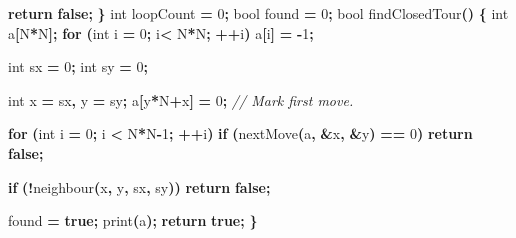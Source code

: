 \documentclass[
]{article}
\newenvironment{Shaded}{\begin{snugshade}}{\end{snugshade}}
\newcommand{\CommentTok}[1]{\textcolor[rgb]{0.56,0.35,0.01}{\textit{#1}}}
\newcommand{\ControlFlowTok}[1]{\textcolor[rgb]{0.13,0.29,0.53}{\textbf{#1}}}
\newcommand{\DataTypeTok}[1]{\textcolor[rgb]{0.13,0.29,0.53}{#1}}
\newcommand{\DecValTok}[1]{\textcolor[rgb]{0.00,0.00,0.81}{#1}}
\newcommand{\KeywordTok}[1]{\textcolor[rgb]{0.13,0.29,0.53}{\textbf{#1}}}
\newcommand{\NormalTok}[1]{#1}
\newcommand{\OperatorTok}[1]{\textcolor[rgb]{0.81,0.36,0.00}{\textbf{#1}}}
\begin{document}
\begin{Shaded}
\begin{Highlighting}[]
    \ControlFlowTok{return} \KeywordTok{false}\OperatorTok{;}
\OperatorTok{\}}
\DataTypeTok{int}\NormalTok{ loopCount }\OperatorTok{=} \DecValTok{0}\OperatorTok{;}
\DataTypeTok{bool}\NormalTok{ found }\OperatorTok{=} \DecValTok{0}\OperatorTok{;}
\DataTypeTok{bool}\NormalTok{ findClosedTour}\OperatorTok{()}
\OperatorTok{\{}
    \DataTypeTok{int}\NormalTok{ a}\OperatorTok{[}\NormalTok{N}\OperatorTok{*}\NormalTok{N}\OperatorTok{];}
    \ControlFlowTok{for} \OperatorTok{(}\DataTypeTok{int}\NormalTok{ i }\OperatorTok{=} \DecValTok{0}\OperatorTok{;}\NormalTok{ i}\OperatorTok{\textless{}}\NormalTok{ N}\OperatorTok{*}\NormalTok{N}\OperatorTok{;} \OperatorTok{++}\NormalTok{i}\OperatorTok{)}
\NormalTok{        a}\OperatorTok{[}\NormalTok{i}\OperatorTok{]} \OperatorTok{=} \OperatorTok{{-}}\DecValTok{1}\OperatorTok{;}

    \DataTypeTok{int}\NormalTok{ sx }\OperatorTok{=} \DecValTok{0}\OperatorTok{;}
    \DataTypeTok{int}\NormalTok{ sy }\OperatorTok{=} \DecValTok{0}\OperatorTok{;}

    \DataTypeTok{int}\NormalTok{ x }\OperatorTok{=}\NormalTok{ sx}\OperatorTok{,}\NormalTok{ y }\OperatorTok{=}\NormalTok{ sy}\OperatorTok{;}
\NormalTok{    a}\OperatorTok{[}\NormalTok{y}\OperatorTok{*}\NormalTok{N}\OperatorTok{+}\NormalTok{x}\OperatorTok{]} \OperatorTok{=} \DecValTok{0}\OperatorTok{;} \CommentTok{// Mark first move.}

    \ControlFlowTok{for} \OperatorTok{(}\DataTypeTok{int}\NormalTok{ i }\OperatorTok{=} \DecValTok{0}\OperatorTok{;}\NormalTok{ i }\OperatorTok{\textless{}}\NormalTok{ N}\OperatorTok{*}\NormalTok{N}\OperatorTok{{-}}\DecValTok{1}\OperatorTok{;} \OperatorTok{++}\NormalTok{i}\OperatorTok{)}
        \ControlFlowTok{if} \OperatorTok{(}\NormalTok{nextMove}\OperatorTok{(}\NormalTok{a}\OperatorTok{,} \OperatorTok{\&}\NormalTok{x}\OperatorTok{,} \OperatorTok{\&}\NormalTok{y}\OperatorTok{)} \OperatorTok{==} \DecValTok{0}\OperatorTok{)}
            \ControlFlowTok{return} \KeywordTok{false}\OperatorTok{;}

    \ControlFlowTok{if} \OperatorTok{(!}\NormalTok{neighbour}\OperatorTok{(}\NormalTok{x}\OperatorTok{,}\NormalTok{ y}\OperatorTok{,}\NormalTok{ sx}\OperatorTok{,}\NormalTok{ sy}\OperatorTok{))}
        \ControlFlowTok{return} \KeywordTok{false}\OperatorTok{;}

\NormalTok{    found }\OperatorTok{=} \KeywordTok{true}\OperatorTok{;}
\NormalTok{    print}\OperatorTok{(}\NormalTok{a}\OperatorTok{);}
    \ControlFlowTok{return} \KeywordTok{true}\OperatorTok{;}
\OperatorTok{\}}


\end{Highlighting}
\end{Shaded}
\end{document}
